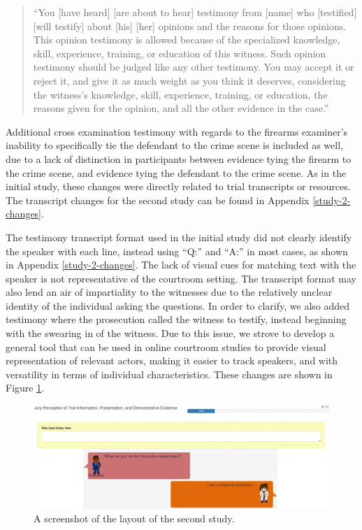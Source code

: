 \documentclass[print]{nuthesis}
\begin{document}
\begin{quote}
``You {[}have heard{]} {[}are about to hear{]} testimony from {[}name{]} who {[}testified{]} {[}will testify{]} about {[}his{]} {[}her{]} opinions and the reasons for those opinions. This opinion testimony is allowed because of the specialized knowledge, skill, experience, training, or education of this witness.
Such opinion testimony should be judged like any other testimony. You may accept it or reject it, and give it as much weight as you think it deserves, considering the witness's knowledge, skill, experience, training, or education, the reasons given for the opinion, and all the other evidence in the case.''
\end{quote}

Additional cross examination testimony with regards to the firearms examiner's inability to specifically tie the defendant to the crime scene is included as well, due to a lack of distinction in participants between evidence tying the firearm to the crime scene, and evidence tying the defendant to the crime scene.
As in the initial study, these changes were directly related to trial transcripts or resources.
The transcript changes for the second study can be found in Appendix \ref{study-2-changes}.

The testimony transcript format used in the initial study did not clearly identify the speaker with each line, instead using ``Q:'' and ``A:'' in most cases, as shown in Appendix \ref{study-2-changes}.
The lack of visual cues for matching text with the speaker is not representative of the courtroom setting.
The transcript format may also lend an air of impartiality to the witnesses due to the relatively unclear identity of the individual asking the questions.
In order to clarify, we also added testimony where the prosecution called the witness to testify, instead beginning with the swearing in of the witness.
Due to this issue, we strove to develop a general tool that can be used in online courtroom studies to provide visual representation of relevant actors, making it easier to track speakers, and with versatility in terms of individual characteristics.
These changes are shown in Figure \ref{fig:testimonyformat}.

\begin{figure}

{\centering \includegraphics[width=\linewidth,angle=90]{images/Study2_Screenshot} 

}

\caption{A screenshot of the layout of the second study.}\label{fig:testimonyformat}
\end{figure}
\end{document}

